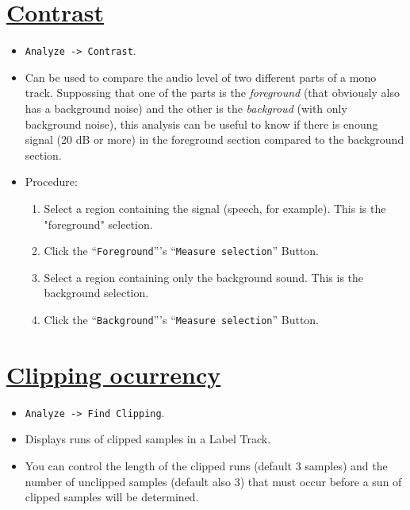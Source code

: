 \section{\href{http://manual.audacityteam.org/o/man/contrast.html}{Contrast}}
\begin{itemize}
\item \verb|Analyze -> Contrast|.
\item Can be used to compare the audio level of two different parts of
  a mono track. Suppossing that one of the parts is the
  \emph{foreground} (that obviously also has a background noise) and
  the other is the \emph{backgroud} (with only background noise), this
  analysis can be useful to know if there is enoung signal (20 dB or
  more) in the foreground section compared to the background section.
\item Procedure:
  \begin{enumerate}
  \item Select a region containing the signal (speech, for
    example). This is the "foreground" selection.
  \item Click the ``\verb|Foreground|'''s ``\verb|Measure selection|'' Button.
  \item Select a region containing only the background sound. This is
    the background selection.
  \item Click the ``\verb|Background|'''s ``\verb|Measure selection|'' Button.
  \end{enumerate}
\end{itemize}

\section{\href{http://manual.audacityteam.org/o/man/find_clipping.html}{Clipping ocurrency}}
\begin{itemize}
\item \verb|Analyze -> Find Clipping|.
\item Displays runs of clipped samples in a Label Track.
\item You can control the length of the clipped runs (default 3
  samples) and the number of unclipped samples (default also 3) that
  must occur before a sun of clipped samples will be determined.
\end{itemize}

